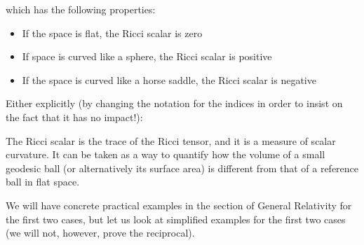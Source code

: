 	which has the following properties:
	\begin{itemize}
		\item If the space is flat, the Ricci scalar is zero
	
		\item If space is curved like a sphere, the Ricci scalar is positive
	
		\item If the space is curved like a horse saddle, the Ricci scalar is negative
	\end{itemize}
	Either explicitly (by changing the notation for the indices in order to insist on the fact that it has no impact!):
	
	The Ricci scalar is the trace of the Ricci tensor, and it is a measure of scalar curvature. It can be taken as a way to quantify how the volume of a small geodesic ball (or alternatively its surface area) is different from that of a reference ball in flat space.

	We will have concrete practical examples in the section of General Relativity for the first two cases, but let us look at simplified examples for the first two cases (we will not, however, prove the reciprocal).
	
